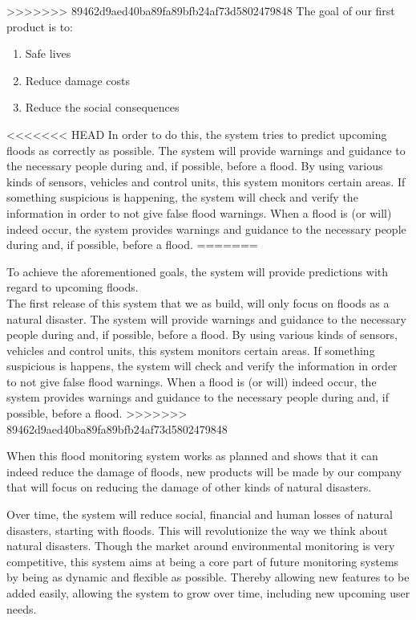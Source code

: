 >>>>>>> 89462d9aed40ba89fa89bfb24af73d5802479848
The goal of our first product is to:
\begin{enumerate}
  \item Safe lives
  \item Reduce damage costs
  \item Reduce the social consequences
\end{enumerate}
<<<<<<< HEAD
In order to do this, the system tries to predict upcoming floods as correctly as possible. The system will provide warnings and guidance to the necessary people during and, if possible, before a flood. By using various kinds of sensors, vehicles and control units, this system monitors certain areas. If something suspicious is happening, the system will check and verify the information in order to not give false flood warnings. When a flood is (or will) indeed occur, the system   provides warnings and guidance to the necessary people during and, if possible, before a flood. 
=======

To achieve the aforementioned goals, the system will provide predictions with regard to upcoming floods.\\

The first release of this system that we as \CompanyName build, will only focus on floods as a natural disaster. The system will provide warnings and guidance to the necessary people during and, if possible, before a flood. By using various kinds of sensors, vehicles and control units, this system monitors certain areas. If something suspicious is happens, the system will check and verify the information in order to not give false flood warnings. When a flood is (or will) indeed occur, the system   provides warnings and guidance to the necessary people during and, if possible, before a flood. 
>>>>>>> 89462d9aed40ba89fa89bfb24af73d5802479848

When this flood monitoring system works as planned and shows that it can indeed reduce the damage of floods, new products will be made by our company that will focus on reducing the damage of other kinds of natural disasters.

Over time, the system will reduce social, financial and human losses of natural disasters, starting with floods. This will revolutionize the way we think about natural disasters. Though the market around environmental monitoring is very competitive, this system aims at being a core part of future monitoring systems by being as dynamic and flexible as possible. Thereby allowing new features to be added easily, allowing the system to grow over time, including new upcoming user needs.